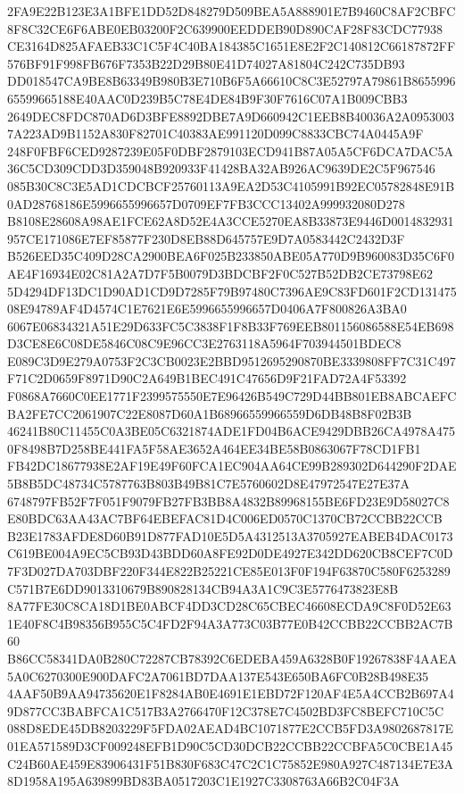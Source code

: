 \documentclass[UTF8,fontset=fandol,zihao=-4,a4paper]{ctexart}
\begin{document}
{{2FA9E22B123E3A1BFE1DD52D848279D509BEA5A888901E7B9460C8AF2CBFC8F8C32CE6F6ABE0EB03200F2C639900EEDDEB90D890CAF28F83CDC77938
CE3164D825AFAEB33C1C5F4C40BA184385C1651E8E2F2C140812C66187872FF576BF91F998FB676F7353B22D29B80E41D74027A81804C242C735DB93
DD018547CA9BE8B63349B980B3E710B6F5A66610C8C3E52797A79861B865599665599665188E40AAC0D239B5C78E4DE84B9F30F7616C07A1B009CBB3
2649DEC8FDC870AD6D3BFE8892DBE7A9D660942C1EEB8B40036A2A09530037A223AD9B1152A830F82701C40383AE991120D099C8833CBC74A0445A9F
248F0FBF6CED9287239E05F0DBF2879103ECD941B87A05A5CF6DCA7DAC5A36C5CD309CDD3D359048B920933F41428BA32AB926AC9639DE2C5F967546
085B30C8C3E5AD1CDCBCF25760113A9EA2D53C4105991B92EC05782848E91B0AD28768186E5996655996657D0709EF7FB3CCC13402A999932080D278
B8108E28608A98AE1FCE62A8D52E4A3CCE5270EA8B33873E9446D0014832931957CE171086E7EF85877F230D8EB88D645757E9D7A0583442C2432D3F
B526EED35C409D28CA2900BEA6F025B233850ABE05A770D9B960083D35C6F0AE4F16934E02C81A2A7D7F5B0079D3BDCBF2F0C527B52DB2CE73798E62
5D4294DF13DC1D90AD1CD9D7285F79B97480C7396AE9C83FD601F2CD13147508E94789AF4D4574C1E7621E6E5996655996657D0406A7F800826A3BA0
6067E06834321A51E29D633FC5C3838F1F8B33F769EEB801156086588E54EB698D3CE8E6C08DE5846C08C9E96CC3E2763118A5964F703944501BDEC8
E089C3D9E279A0753F2C3CB0023E2BBD9512695290870BE3339808FF7C31C497F71C2D0659F8971D90C2A649B1BEC491C47656D9F21FAD72A4F53392
F0868A7660C0EE1771F2399575550E7E96426B549C729D44BB801EB8ABCAEFCBA2FE7CC2061907C22E8087D60A1B68966559966559D6DB48B8F02B3B
46241B80C11455C0A3BE05C6321874ADE1FD04B6ACE9429DBB26CA4978A4750F8498B7D258BE441FA5F58AE3652A464EE34BE58B0863067F78CD1FB1
FB42DC18677938E2AF19E49F60FCA1EC904AA64CE99B289302D644290F2DAE5B8B5DC48734C5787763B803B49B81C7E5760602D8E47972547E27E37A
6748797FB52F7F051F9079FB27FB3BB8A4832B89968155BE6FD23E9D58027C8E80BDC63AA43AC7BF64EBEFAC81D4C006ED0570C1370CB72CCBB22CCB
B23E1783AFDE8D60B91D877FAD10E5D5A4312513A3705927EABEB4DAC0173C619BE004A9EC5CB93D43BDD60A8FE92D0DE4927E342DD620CB8CEF7C0D
7F3D027DA703DBF220F344E822B25221CE85E013F0F194F63870C580F6253289C571B7E6DD9013310679B890828134CB94A3A1C9C3E5776473823E8B
8A77FE30C8CA18D1BE0ABCF4DD3CD28C65CBEC46608ECDA9C8F0D52E631E40F8C4B98356B955C5C4FD2F94A3A773C03B77E0B42CCBB22CCBB2AC7B60
B86CC58341DA0B280C72287CB78392C6EDEBA459A6328B0F19267838F4AAEA5A0C6270300E900DAFC2A7061BD7DAA137E543E650BA6FC0B28B498E35
4AAF50B9AA94735620E1F8284AB0E4691E1EBD72F120AF4E5A4CCB2B697A49D877CC3BABFCA1C517B3A2766470F12C378E7C4502BD3FC8BEFC710C5C
088D8EDE45DB8203229F5FDA02AEAD4BC1071877E2CCB5FD3A9802687817E01EA571589D3CF009248EFB1D90C5CD30DCB22CCBB22CCBFA5C0CBE1A45
C24B60AE459E83906431F51B830F683C47C2C1C75852E980A927C487134E7E3A8D1958A195A639899BD83BA0517203C1E1927C3308763A66B2C04F3A
}}
\end{document}
